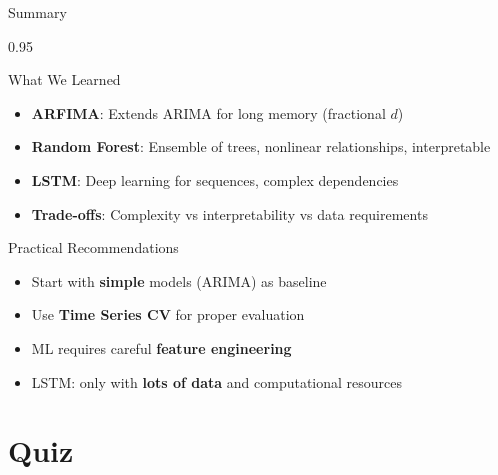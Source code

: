 \documentclass[9pt, aspectratio=169, t]{beamer}
\begin{document}
\begin{frame}{Summary}
    \begin{cminipage}{0.95\textwidth}
    \begin{block}{What We Learned}
        \begin{itemize}\setlength{\itemsep}{0pt}
            \item \textbf{ARFIMA}: Extends ARIMA for long memory (fractional $d$)
            \item \textbf{Random Forest}: Ensemble of trees, nonlinear relationships, interpretable
            \item \textbf{LSTM}: Deep learning for sequences, complex dependencies
            \item \textbf{Trade-offs}: Complexity vs interpretability vs data requirements
        \end{itemize}
    \end{block}

    \vspace{0.2cm}

    \begin{alertblock}{Practical Recommendations}
        \begin{itemize}\setlength{\itemsep}{0pt}
            \item Start with \textbf{simple} models (ARIMA) as baseline
            \item Use \textbf{Time Series CV} for proper evaluation
            \item ML requires careful \textbf{feature engineering}
            \item LSTM: only with \textbf{lots of data} and computational resources
        \end{itemize}
    \end{alertblock}
    \end{cminipage}
\end{frame}

\section{Quiz}
\end{document}
